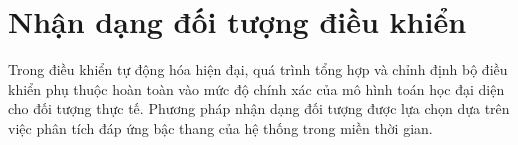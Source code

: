 \documentclass[../main.tex]{subfiles}
\begin{document}







\section{Nhận dạng đối tượng điều khiển}

Trong điều khiển tự động hóa hiện đại, quá trình tổng hợp và chỉnh định bộ điều khiển phụ thuộc hoàn toàn vào mức độ chính xác của mô hình toán học đại diện cho đối tượng thực tế. Phương pháp nhận dạng đối tượng được lựa chọn dựa trên việc phân tích đáp ứng bậc thang của hệ thống trong miền thời gian.
\end{document}
